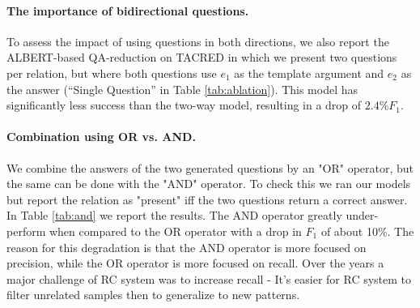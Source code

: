 \documentclass[11pt]{article}
\begin{document}
\begin{table}[t]
\caption{{\bf Answer combination method.} TACRED performance when using the AND combination (in brackets, the corresponding OR combination). Using AND substantially increase precision, while dropping recall, resulting in a lower F$_1$ score on all models.}
\label{tab:and}
\end{table}

\paragraph{The importance of bidirectional questions.} To assess the impact of using questions in both directions, we also report the ALBERT-based QA-reduction on TACRED in which we present two questions per relation, but where both questions use $e_1$ as the template argument and $e_2$ as the answer (``Single Question'' in Table \ref{tab:ablation}). This model has significantly less success than the two-way model, resulting in a drop of $2.4\% F_1$. 



\paragraph{Combination using OR vs. AND.}
We combine the answers of the two generated questions by an "OR" operator, but the same can be done with the "AND" operator. To check this we ran our models but report the relation as "present" iff the two questions return a correct answer. In Table \ref{tab:and} we report the results. The AND operator greatly under-perform when compared to the OR operator with a drop in $F_1$ of about 10\%. The reason for this degradation is that the AND operator is more focused on precision, while the OR operator is more focused on recall. Over the years a major challenge of RC system was to increase recall \cite{Ji} - It's easier for RC system to filter unrelated samples then to generalize to new patterns. 
\end{document}
